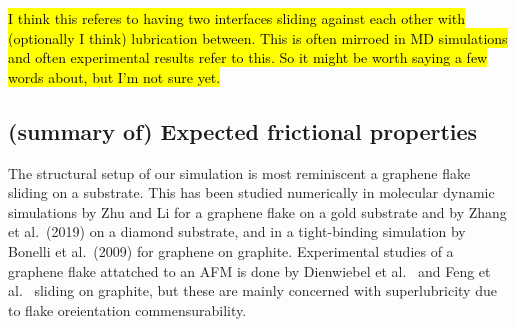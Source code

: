 \hl{I think this referes to having two interfaces sliding against each other with (optionally I think) lubrication between. This is often mirroed in MD simulations and often experimental results refer to this. So it might be worth saying a few words about, but I'm not sure yet.}


















\subsection{(summary of) Expected frictional properties}\label{sec:expected_prop}



The structural setup of our simulation is most reminiscent a graphene flake sliding on a substrate. This has been studied numerically in molecular dynamic simulations by Zhu and Li \cite[2018]{zhu_study_2018} for a graphene flake on a gold substrate and by Zhang et al.\ \cite{ma12091425}(2019) on a diamond substrate, and in a tight-binding simulation by Bonelli et al.\ \cite{bonelli_atomistic_2009}(2009) for graphene on graphite. Experimental studies of a graphene flake attatched to an AFM is done by Dienwiebel et al.\ \cite[2005]{DIENWIEBEL2005197} and Feng et al.\ \cite[2013]{feng_superlubric_2013} sliding on graphite, but these are mainly concerned with superlubricity due to flake oreientation commensurability. 

